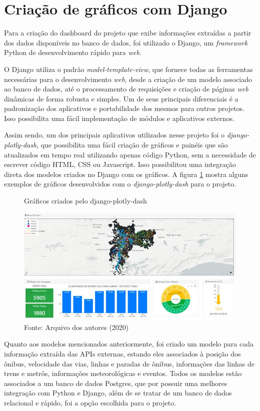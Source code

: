 \section{Criação de gráficos com Django}
\indent
\par Para a criação do dashboard do projeto que exibe informações extraídas a partir dos dados disponíveis no banco de dados, foi utilizado o Django, um \textit{framework} Python de desenvolvimento rápido para \textit{web}.
\indent
\par O Django utiliza o padrão \textit{model-template-view}, que fornece todas as ferramentas necessárias para o desenvolvimento \textit{web}, desde a criação de um modelo associado ao banco de dados, até o processamento de requisições e criação de páginas \textit{web} dinâmicas de forma robusta e simples. Um de seus principais diferenciais é a padronização dos aplicativos e portabilidade dos mesmos para outros projetos. Isso possibilita uma fácil implementação de módulos e aplicativos externos.
\indent
\par Assim sendo, um dos principais aplicativos utilizados nesse projeto foi o \textit{django-plotly-dash}, que possibilita uma fácil criação de gráficos e painéis que são atualizados em tempo real utilizando apenas código Python, sem a necessidade de escrever código HTML, CSS ou Javascript. Isso possibilitou uma integração direta dos modelos criados no Django com os gráficos. A figura \ref{printDashboard} mostra alguns exemplos de gráficos desenvolvidos com o \textit{django-plotly-dash} para o projeto.

\begin{figure}[H]
    \centering
    \caption{Gráficos criados pelo django-plotly-dash}
    \includegraphics[width=1.0\linewidth]{Imagens/printDashboard.jpeg}
    \caption*{Fonte: Arquivo dos autores (2020)}
    \label{printDashboard}
\end{figure}
\indent
\par Quanto aos modelos mencionados anteriormente, foi criado um modelo para cada informação extraída das APIs externas, estando eles associados à posição dos ônibus, velocidade das vias, linhas e paradas de ônibus, informações das linhas de trens e metrôs, informações meteorológicas e eventos. Todos os modelos estão associados a um banco de dados Postgres, que por possuir uma melhores integração com Python e Django, além de se tratar de um banco de dados relacional e rápido, foi a opção escolhida para o projeto.


